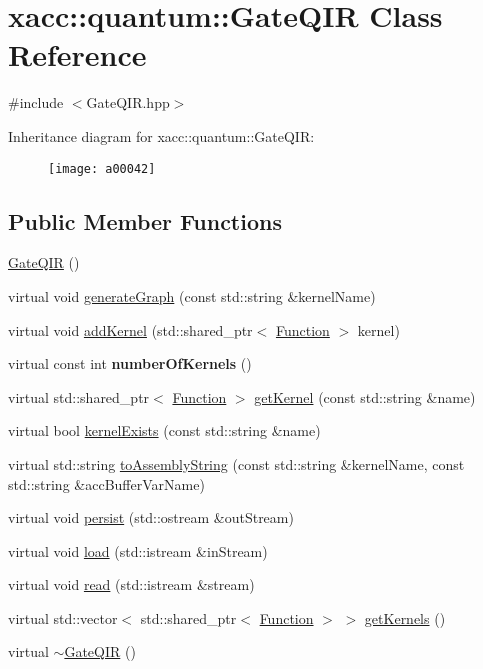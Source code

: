 \hypertarget{a00042}{}\section{xacc\+:\+:quantum\+:\+:Gate\+Q\+IR Class Reference}
\label{a00042}


{\ttfamily \#include $<$Gate\+Q\+I\+R.\+hpp$>$}

Inheritance diagram for xacc\+:\+:quantum\+:\+:Gate\+Q\+IR\+:\begin{figure}[H]
\begin{center}
\leavevmode
\texttt{[image: a00042]}
\end{center}
\end{figure}
\subsection*{Public Member Functions}
\begin{DoxyCompactItemize}
\item 
\hyperlink{a00042_afb99f610a6b123538c659169c131a634}{Gate\+Q\+IR} ()
\item 
virtual void \hyperlink{a00042_ad1ddd6105346dd9fc78648fd812285ed}{generate\+Graph} (const std\+::string \&kernel\+Name)
\item 
virtual void \hyperlink{a00042_aa6ed2cf2cbcfec8105c327a4fa95346f}{add\+Kernel} (std\+::shared\+\_\+ptr$<$ \hyperlink{a00038}{Function} $>$ kernel)
\item 
virtual const int {\bfseries number\+Of\+Kernels} ()\hypertarget{a00042_aca6be85526b14f500e7f98954dd6da5c}{}\label{a00042_aca6be85526b14f500e7f98954dd6da5c}

\item 
virtual std\+::shared\+\_\+ptr$<$ \hyperlink{a00038}{Function} $>$ \hyperlink{a00042_a194758b6edcc3ae0c7fe8004f9bfe690}{get\+Kernel} (const std\+::string \&name)
\item 
virtual bool \hyperlink{a00042_a692f95099caa7c024110a3f035941dca}{kernel\+Exists} (const std\+::string \&name)
\item 
virtual std\+::string \hyperlink{a00042_a7153f7e9f516d43af3d5d4f95d60bd86}{to\+Assembly\+String} (const std\+::string \&kernel\+Name, const std\+::string \&acc\+Buffer\+Var\+Name)
\item 
virtual void \hyperlink{a00042_a40e1d07e4dfd3794ef53fca3cdbdca61}{persist} (std\+::ostream \&out\+Stream)
\item 
virtual void \hyperlink{a00042_a07f26eeb362ac480d20da6cdc8c8fb39}{load} (std\+::istream \&in\+Stream)
\item 
virtual void \hyperlink{a00042_a26019e2f1e13e64645e29aee86ac58b1}{read} (std\+::istream \&stream)
\item 
virtual std\+::vector$<$ std\+::shared\+\_\+ptr$<$ \hyperlink{a00038}{Function} $>$ $>$ \hyperlink{a00042_a4ace7ee5ebef84b1f39aaf5ed12c6cc6}{get\+Kernels} ()
\item 
virtual \hyperlink{a00042_ac88db03f1dd29e2d36aaa6c01a130008}{$\sim$\+Gate\+Q\+IR} ()
\end{DoxyCompactItemize}
